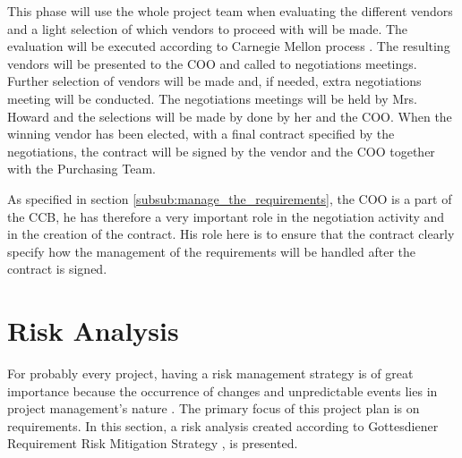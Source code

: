 \documentclass[a4paper]{article}
\begin{document}
This phase will use the whole project team when evaluating the different vendors and a light selection of which vendors to proceed with will be made. The evaluation will be executed according to Carnegie Mellon process \cite{eval}. The resulting vendors will be presented to the COO and called to negotiations meetings. Further selection of vendors will be made and, if needed, extra negotiations meeting will be conducted. The negotiations meetings will be held by Mrs. Howard and the selections will be made by done by her and the COO. When the winning vendor has been elected, with a final contract specified by the negotiations, the contract will be signed by the vendor and the COO together with the Purchasing Team.

As specified in section \ref{subsub:manage_the_requirements}, the COO is a part of the CCB, he has therefore a very important role in the negotiation activity and in the creation of the contract. His role here is to ensure that the contract clearly specify how the management of the requirements will be handled after the contract is signed.
 
\section{Risk Analysis}
\label{sec:risk_analysis}
For probably every project, having a risk management strategy is of great importance because the occurrence of changes and unpredictable events lies in project management's nature \cite{maylor}. The primary focus of this project plan is on requirements. In this section, a risk analysis created according to Gottesdiener Requirement Risk Mitigation Strategy \cite{gott2}, is presented. 
\end{document}
